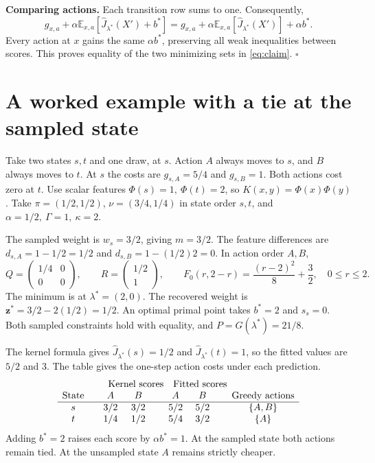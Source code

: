 \documentclass[12pt,a4paper]{article}
\newcommand{\E}{\mathbb E}
\newcommand{\Jhat}{\widehat J}
\newcommand{\lead}[1]{\par\smallskip\noindent\textbf{#1}\enspace}
\begin{document}
\lead{Comparing actions.} Each transition row sums to one. Consequently,
\[
 g_{x,a}+\alpha\E_{x,a}[\Jhat_{\lambda^*}(X')+b^*]
  =g_{x,a}+\alpha\E_{x,a}[\Jhat_{\lambda^*}(X')]+\alpha b^* .
\]
Every action at \(x\) gains the same \(\alpha b^*\), preserving all
weak inequalities between scores.
This proves equality of the two minimizing sets in \eqref{eq:claim}.
\hfill\(\square\)

\newpage
\section*{A worked example with a tie at the sampled state}
Take two states \(s,t\) and one draw, at \(s\). Action \(A\) always moves
to \(s\), and \(B\) always moves to \(t\). At \(s\) the costs are
\(g_{s,A}=5/4\) and \(g_{s,B}=1\). Both actions cost zero at \(t\).
Use scalar features \(\Phi(s)=1,\ \Phi(t)=2\), so \(K(x,y)=\Phi(x)\Phi(y)\).
Take \(\pi=(1/2,1/2)\), \(\nu=(3/4,1/4)\) in state order \(s,t\), and
\(\alpha=1/2,\ \Gamma=1,\ \kappa=2\).

The sampled weight is \(w_s=3/2\), giving \(m=3/2\).
The feature differences are \(d_{s,A}=1-1/2=1/2\) and
\(d_{s,B}=1-(1/2)2=0\). In action order \(A,B\),
\[
 Q=\begin{pmatrix}1/4&0\\0&0\end{pmatrix},\qquad
 R=\begin{pmatrix}1/2\\1\end{pmatrix},\qquad
 F_0(r,2-r)=\frac{(r-2)^2}{8}+\frac32,\quad 0\le r\le2 .
\]
The minimum is at \(\lambda^*=(2,0)\). The recovered weight is
\(\mathbf z^*=3/2-2(1/2)=1/2\). An optimal primal point takes
\(b^*=2\) and \(s_s=0\). Both sampled constraints hold with equality,
and \(P=G(\lambda^*)=21/8\).

The kernel formula gives \(\Jhat_{\lambda^*}(s)=1/2\) and
\(\Jhat_{\lambda^*}(t)=1\), so the fitted values are \(5/2\) and \(3\).
The table gives the one-step action costs under each prediction.
\[
\begin{array}{c@{\qquad}cc@{\qquad}cc@{\qquad}c}
 &\multicolumn{2}{c}{\text{Kernel scores}}&
  \multicolumn{2}{c}{\text{Fitted scores}}&\\
 \text{State}&A&B&A&B&\text{Greedy actions}\\ \hline
 s&3/2&3/2&5/2&5/2&\{A,B\}\\
 t&1/4&1/2&5/4&3/2&\{A\}
\end{array}
\]
Adding \(b^*=2\) raises each score by \(\alpha b^*=1\). At the sampled
state both actions remain tied. At the unsampled state \(A\) remains
strictly cheaper.
\end{document}
